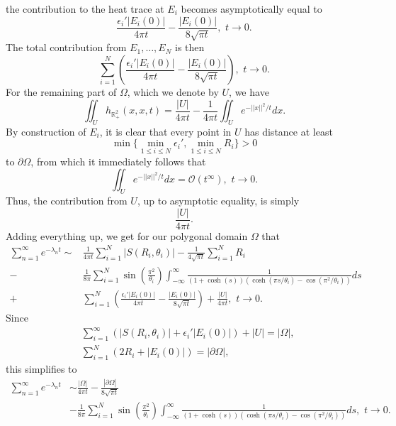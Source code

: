 \documentclass{amsart}
\theoremstyle{definition}
\newcommand{\nn}{\nonumber}
\newcommand*{\R}{\mathbb{R}}
\begin{document}
the contribution to the heat trace at $E_i$ becomes asymptotically equal to
\begin{equation*}
    \frac{\epsilon_i'|E_i(0)|}{4\pi t}-\frac{|E_i(0)|}{8\sqrt{\pi t}}, \,\, t \to 0.
\end{equation*}
The total contribution from $E_1,\dots,E_N$ is then
\begin{equation*}
    \sum_{i = 1}^N \left(\frac{\epsilon_i'|E_i(0)|}{4\pi t}-\frac{|E_i(0)|}{8\sqrt{\pi t}}\right), \,\, t \to 0.
\end{equation*}
For the remaining part of $\Omega$, which we denote by $U$, we have
\begin{equation*}
    \iint_U h_{\R_+^2}(x,x,t) = \frac{|U|}{4\pi t} - \frac{1}{4\pi t}\iint_U e^{-||x||^2/t} dx.
\end{equation*}
By construction of $E_i$, it is clear that every point in $U$ has distance at least
\begin{equation*}
    \min\{\min_{1 \leq i \leq N} \epsilon_i', \min_{1 \leq i \leq N} R_i\} > 0
\end{equation*}
to $\partial\Omega$, from which it immediately follows that
\begin{equation*}
    \iint_U e^{-||x||^2/t} dx = \mathcal{O}(t^\infty), \,\, t \to 0.
\end{equation*}
Thus, the contribution from $U$, up to asymptotic equality, is simply \begin{equation*}
    \frac{|U|}{4\pi t}.
\end{equation*}
Adding everything up, we get for our polygonal domain $\Omega$ that
\begin{align*}
    \sum_{n = 1}^\infty e^{-\lambda_n t} \sim &\frac{1}{4\pi t}\sum_{i=1}^N |S(R_i, \theta_i)| - \frac{1}{4\sqrt{\pi t}}\sum_{i=1}^N R_i \\
    -&\frac{1}{8\pi} \sum_{i = 1}^N \sin(\frac{\pi^2}{\theta_i}) \int_{-\infty}^\infty \frac{1}{(1+\cosh(s))(\cosh(\pi s/\theta_i) - \cos(\pi^2/\theta_i))} ds \\
    +&\sum_{i = 1}^N \left(\frac{\epsilon_i'|E_i(0)|}{4\pi t} - \frac{|E_i(0)|}{8\sqrt{\pi t}}\right) + \frac{|U|}{4\pi t}, \,\, t \to 0.
\end{align*}
Since
\begin{align*}
    &\sum_{i=1}^\infty \left(|S(R_i, \theta_i)| + \epsilon_i'|E_i(0)| \right) + |U| = |\Omega|, \\
    &\sum_{i=1}^N(2R_i + |E_i(0)|) = |\partial\Omega|,
\end{align*}
this simplifies to
\begin{align}
    \sum_{n = 1}^\infty e^{-\lambda_n t} &\sim \frac{|\Omega|}{4\pi t} - \frac{|\partial\Omega|}{8\sqrt{\pi t}} \nn \\
    &-\frac{1}{8\pi} \sum_{i = 1}^N \sin\left(\frac{\pi^2}{\theta_i}\right) \int_{-\infty}^\infty \frac{1}{(1+\cosh(s))(\cosh(\pi s/\theta_i) - \cos(\pi^2/\theta_i))} ds, \,\, t \to 0. \label{eq:hard_integral}
\end{align}
\end{document}
